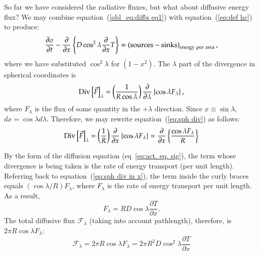 \afterpage{\clearpage}


So far we have considered the radiative fluxes, but what about
diffusive energy flux?  We may combine equation~(\ref{obl_eq:diffu
eq1}) with equation~(\ref{eq:def hc}) to produce:
\begin{equation}
\frac{\partial \sigma}{\partial t} - \frac{\partial}{\partial x} \left\{ D\cos^2\lambda \frac{\partial}{\partial x}T \right\} = \left({\rm sources - sinks}\right)_{\rm energy~per~area},
\label{eq:act. eq. sig}
\end{equation}
where we have substituted $\cos^2 \lambda$ for $(1-x^2)$.  The
$\lambda$ part of the divergence in spherical coordinates is
\begin{equation}
{\rm Div}\left[\vec{F}\right]_\lambda = \left(\frac{1}{R \cos \lambda}\right) \frac{\partial}{\partial \lambda} \left\{ \cos \lambda F_\lambda \right\},
\label{eq:sph div}
\end{equation}
where $F_\lambda$ is the flux of some quantity in the $+\lambda$
direction.  Since $x\equiv \sin \lambda$, $dx = \cos\lambda d\lambda$.
Therefore, we may rewrite equation~(\ref{eq:sph div}) as follows:
\begin{equation}
{\rm Div}\left[\vec{F}\right]_\lambda = \left(\frac{1}{R}\right) \frac{\partial}{\partial x} \left\{ \cos \lambda F_\lambda \right\} = \frac{\partial}{\partial x} \left\{ \frac{\cos \lambda F_\lambda}{R} \right\}
\label{eq:sph div in x}
\end{equation}

By the form of the diffusion equation (eq~\ref{eq:act. eq. sig}), the
term whose divergence is being taken is the rate of energy transport
(per unit length).  Referring back to equation~(\ref{eq:sph div in
x}), the term inside the curly braces equals $(\cos\lambda/R)
F_\lambda$, where $F_\lambda$ is the rate of energy transport per unit
length.  As a result,
\begin{equation}
F_\lambda = R D \cos\lambda \frac{\partial T}{\partial x}.
\label{eq:flux}
\end{equation}
The total diffusive flux $\mathcal{F}_\lambda$ (taking into account
pathlength), therefore, is $2\pi R \cos\lambda F_\lambda$:
\begin{equation}
\mathcal{F}_\lambda = 2\pi R \cos\lambda F_\lambda = 2 \pi R^2 D \cos^2\lambda \frac{\partial T}{\partial x}
\label{eq:total flux}
\end{equation}

